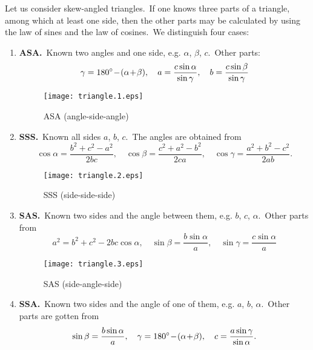 \documentclass[12pt]{article}
\theoremstyle{definition}
\begin{document}
Let us consider skew-angled triangles.\, If one knows three parts of a triangle, among which at least one side, then the other parts may be calculated by using the law of sines and the law of cosines.\, We distinguish four cases:
\begin{enumerate}

\item \textbf{ASA.}\, Known two angles and one side, e.g. $\alpha$, $\beta$, $c$.\, Other parts:
$$\gamma = 180\sp\circ\!-\!(\alpha\!+\!\beta), \quad
a = \frac{c\sin\alpha}{\sin\gamma},\quad b = \frac{c\sin\beta}{\sin\gamma}$$

\begin{figure}[!htb]
\begin{center}
\texttt{[image: triangle.1.eps]}
\end{center}
\caption{ASA (angle-side-angle)}
\end{figure}

\item \textbf{SSS.}\, Known all sides $a$, $b$, $c$.\, The angles are obtained from
$$\cos\alpha = \frac{b^2\!+\!c^2\!-\!a^2}{2bc},
 \quad\cos\beta = \frac{c^2\!+\!a^2\!-\!b^2}{2ca}, 
 \quad\cos\gamma = \frac{a^2\!+\!b^2\!-\!c^2}{2ab}.$$

\begin{figure}[!htb]
\begin{center}
\texttt{[image: triangle.2.eps]}
\end{center}
\caption{SSS (side-side-side)}
\end{figure}

\item \textbf{SAS.}\, Known two sides and the angle between them, e.g. $b$, $c$, $\alpha$.\, Other parts from
$$a^2 = b^2\!+\!c^2\!-\!2bc\cos\alpha, \quad \sin\beta = \frac{b\sin\alpha}{a}, 
\quad \sin\gamma = \frac{c\sin\alpha}{a}$$

\begin{figure}[!htb]
\begin{center}
\texttt{[image: triangle.3.eps]}
\end{center}
\caption{SAS (side-angle-side)}
\end{figure}


\item \textbf{SSA.}\, Known two sides and the angle  of one of them, e.g. $a$, $b$, $\alpha$.\, Other parts are gotten from
$$\sin\beta = \frac{b\sin\alpha}{a},
 \quad \gamma = 180\sp\circ\!-\!(\alpha\!+\!\beta), 
 \quad c = \frac{a\sin\gamma}{\sin\alpha}.$$


\end{enumerate}
\end{document}
